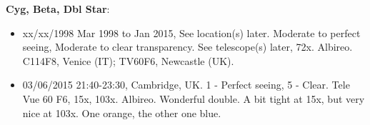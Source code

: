{\bf Cyg, Beta, Dbl Star}:
\begin{itemize}
\item xx/xx/1998 Mar 1998 to Jan 2015, See location(s) later. Moderate to perfect seeing, Moderate to clear transparency. See telescope(s) later, 72x. Albireo. C114F8, Venice (IT); TV60F6, Newcastle (UK).
\item 03/06/2015 21:40-23:30, Cambridge, UK. 1 - Perfect seeing, 5 - Clear. Tele Vue 60 F6, 15x, 103x. Albireo. Wonderful double. A bit tight at 15x, but very nice at 103x. One orange, the other one blue.
\end{itemize}
